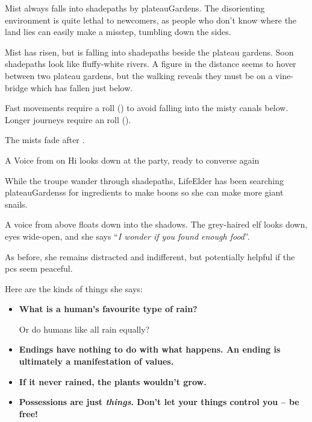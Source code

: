 Mist always falls into \gls{shadepaths} by \gls{plateauGardens}.
The disorienting environment is quite lethal to newcomers, as people who don't know where the land lies can easily make a misstep, tumbling down the sides.

\begin{boxtext}
  Mist has risen, but is falling into \gls{shadepaths} beside the plateau gardens.
  Soon \gls{shadepaths} look like fluffy-white rivers.
  A figure in the distance seems to hover between two plateau gardens, but the walking reveals they must be on a vine-bridge which has fallen just below.
\end{boxtext}

Fast movements require a  roll (\tn[8]) to avoid falling into the misty canals below.
Longer journeys require an  roll (\tn[10]).

The mists fade after .

{A Voice from on Hi}%
{ looks down at the party, ready to converse again}%

While the troupe wander through \gls{shadepaths}, \gls{LifeElder} has been searching \glspl{plateauGardens} for \glspl{ingredient} to make \glspl{boon} so she can make more giant snails.

\begin{boxtext}
  A voice from above floats down into the shadows.
  The grey-haired elf looks down, eyes wide-open, and she says ``\textit{I wonder if you found enough food}''.
\end{boxtext}

As before, she remains distracted and indifferent, but potentially helpful if the \glspl{pc} seem peaceful.

Here are the kinds of things she says:

\begin{itemize}
  \item[\adforn{54}]\bf
  What is a human's favourite type of rain?

  Or do humans like all rain equally?
  \item[\adforn{54}]\bf
  Endings have nothing to do with what happens.
  An ending is ultimately a manifestation of values.
  \item[\adforn{54}]\bf
  If it never rained, the plants wouldn't grow.
  \item[\adforn{54}]\bf
  Possessions are just \emph{things}.
  Don't let your things control you -- be free!
\end{itemize}


